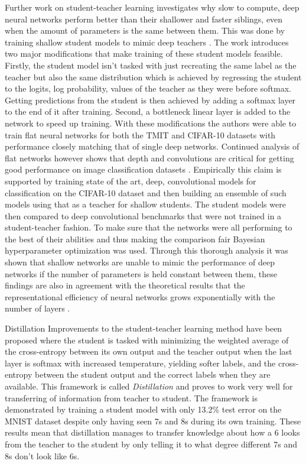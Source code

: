 \documentclass{kththesis}
\newcommand{\bibentry}[1]{\parencite{#1}}
\newcommand{\subsubsubsection}{}
\begin{document}
Further work on student-teacher learning investigates why slow to compute, deep
neural networks perform better than their shallower and faster siblings, even when
the amount of parameters is the same between them.
This was done by training shallow student models to mimic
deep teachers \bibentry{ba2014deep}. The work introduces two major modifications
that make training of these student models feasible. Firstly, the student model
isn't tasked with just recreating the same label as the teacher but also the
same distribution which is achieved by regressing the student to the logits, log
probability, values of the teacher as they were before softmax. Getting
predictions from the student is then achieved by adding a softmax layer to the
end of it after training. Second, a bottleneck linear layer is added to the
network to speed up training. With these modifications the authors were able to train
flat neural networks for both the TMIT and CIFAR-10 datasets with performance
closely matching that of single deep networks. Continued analysis of flat
networks however shows that depth and convolutions are critical for getting good
performance on image classification datasets \bibentry{urban2016deep}.
Empirically this claim is supported by training state of the art, deep,
convolutional models for classification on the CIFAR-10 dataset and then
building an ensemble of such models using that as a teacher for shallow
students. The student models were then compared to deep convolutional benchmarks
that were not trained in a student-teacher fashion. To make sure that the
networks were all performing to the best of their abilities and thus making the
comparison fair Bayesian hyperparameter optimization
\bibentry{snoek2012practical} was used. Through this thorough analysis it was
shown that shallow networks are unable to mimic the performance of deep networks
if the number of parameters is held constant between them, these findings are
also in agreement with the theoretical results that the representational
efficiency of neural networks grows exponentially with the number of layers
\bibentry{liang2016deep}. 

\subsubsubsection{Distillation}
Improvements to the student-teacher learning method have been proposed where the
student is tasked with minimizing the weighted average of the cross-entropy
between its own output and the teacher output when the last layer is softmax
with increased temperature, yielding softer labels, and the cross-entropy
between the student output and the correct labels when they are available. This
framework is called \emph{Distillation} \bibentry{hinton2015distilling} and
proves to work very well for transferring of information from teacher to
student. The framework is demonstrated by training a student model with only
13.2\% test error on the MNIST dataset despite only having seen 7s and 8s during
its own training. These results mean that distillation manages to transfer
knowledge about how a 6 looks from the teacher to the student by only telling it
to what degree different 7s and 8s don't look like 6s. 
\end{document}
